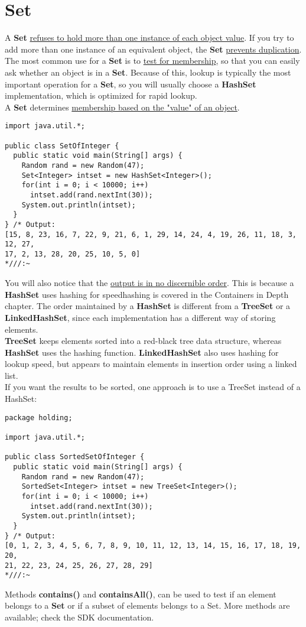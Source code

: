 \documentclass[10pt,letterpaper]{report}
\begin{document}
\section{Set}
A \textbf{Set} \underline{refuses to hold more than one instance of each object value}. If you try to add more than one instance of an equivalent object, the \textbf{Set} \underline{prevents duplication}.\\
The most common use for a \textbf{Set} is to \underline{test for membership}, so that you can easily ask whether an object is in a \textbf{Set}. Because of this, lookup is typically the most important operation for a \textbf{Set}, so you will usually choose a \textbf{HashSet} implementation, which is optimized for rapid lookup.\\
A \textbf{Set} determines \underline{membership based on the "value" of an object}.
\begin{lstlisting}
import java.util.*;

public class SetOfInteger {
  public static void main(String[] args) {
    Random rand = new Random(47);
    Set<Integer> intset = new HashSet<Integer>();
    for(int i = 0; i < 10000; i++)
      intset.add(rand.nextInt(30));
    System.out.println(intset);
  }
} /* Output:
[15, 8, 23, 16, 7, 22, 9, 21, 6, 1, 29, 14, 24, 4, 19, 26, 11, 18, 3, 12, 27,
17, 2, 13, 28, 20, 25, 10, 5, 0]
*///:~
\end{lstlisting}
You will also notice that the \underline{output is in no discernible order}. This is because a \textbf{HashSet} uses hashing for speed\textendash hashing is covered in the Containers in Depth chapter. The order maintained by a \textbf{HashSet} is different from a \textbf{TreeSet} or a \textbf{LinkedHashSet}, since each implementation has a different way of storing elements.\\
\textbf{TreeSet} keeps elements sorted into a red-black tree data structure, whereas \textbf{HashSet} uses the hashing function. \textbf{LinkedHashSet} also uses hashing for lookup speed, but appears to maintain elements in insertion order using a linked list.\\
If you want the results to be sorted, one approach is to use a TreeSet instead of a HashSet:
\begin{lstlisting}
package holding;

import java.util.*;

public class SortedSetOfInteger {
  public static void main(String[] args) {
    Random rand = new Random(47);
    SortedSet<Integer> intset = new TreeSet<Integer>();
    for(int i = 0; i < 10000; i++)
      intset.add(rand.nextInt(30));
    System.out.println(intset);
  }
} /* Output:
[0, 1, 2, 3, 4, 5, 6, 7, 8, 9, 10, 11, 12, 13, 14, 15, 16, 17, 18, 19, 20,
21, 22, 23, 24, 25, 26, 27, 28, 29]
*///:~
\end{lstlisting}
Methods \textbf{contains()} and \textbf{containsAll()}, can be used to test if an element belongs to a \textbf{Set} or if a subset of elements belongs to a Set. More methods are available; check the SDK documentation.
\end{document}
